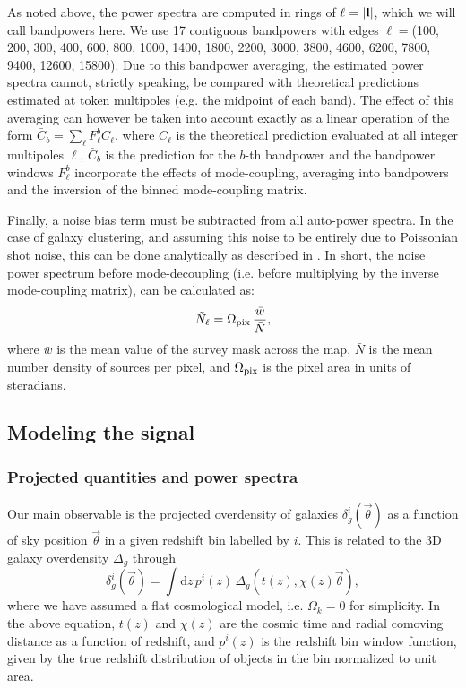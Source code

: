\documentclass[a4paper,11pt]{article}
\newcommand{\nv}{\vec{\theta}}
\begin{document}
    As noted above, the power spectra are computed in rings of $\ell=|{\bf l}|$, which we will call bandpowers here. We use 17 contiguous bandpowers with edges $\ell=$(100, 200, 300, 400, 600, 800, 1000, 1400, 1800, 2200, 3000, 3800, 4600, 6200, 7800, 9400, 12600, 15800). Due to this bandpower averaging, the estimated power spectra cannot, strictly speaking, be compared with theoretical predictions estimated at token multipoles (e.g. the midpoint of each band). The effect of this averaging can however be taken into account exactly as a linear operation of the form $\bar{C}_b=\sum_\ell F^b_{\ell} C_\ell$, where $C_\ell$ is the theoretical prediction evaluated at all integer multipoles $\ell$, $\bar{C}_b$ is the prediction for the $b$-th bandpower and the bandpower windows $F^b_{\ell}$ incorporate the effects of mode-coupling, averaging into bandpowers and the inversion of the binned mode-coupling matrix.
    
    Finally, a noise bias term must be subtracted from all auto-power spectra. In the case of galaxy clustering, and assuming this noise to be entirely due to Poissonian shot noise, this can be done analytically as described in \cite{2019MNRAS.484.4127A}. In short, the noise power spectrum before mode-decoupling (i.e. before multiplying by the inverse mode-coupling matrix), can be calculated as:
    \begin{equation}\label{eq:nell}
      \tilde{N}_\ell = \Omega_{\rm pix}\,\frac{\bar{w}}{\bar{N}},
    \end{equation}
    where $\bar{w}$ is the mean value of the survey mask across the map, $\bar{N}$ is the mean number density of sources per pixel, and $\Omega_{\rm pix}$ is the pixel area in units of steradians.

  \subsection{Modeling the signal}\label{ssec:methods.theory}
  \subsubsection{Projected quantities and power spectra}\label{sssec:methods.theory.cellpk}
    Our main observable is the projected overdensity of galaxies $\delta^i_g(\nv)$ as a function of sky position $\nv$ in a given redshift bin labelled by $i$. This is related to the 3D galaxy overdensity $\Delta_g$ through
    \begin{equation}
      \delta^i_g(\nv)=\int \mathrm{d}z\,p^i(z)\,\Delta_g\left(t(z),\chi(z)\nv\right),
    \end{equation}
where we have assumed a flat cosmological model, i.e. $\Omega_{k} = 0$ for simplicity.
    In the above equation, $t(z)$ and $\chi(z)$ are the cosmic time and radial comoving distance as a function of redshift, and $p^i(z)$ is the redshift bin window function, given by the true redshift distribution of objects in the bin normalized to unit area.
  
\end{document}
